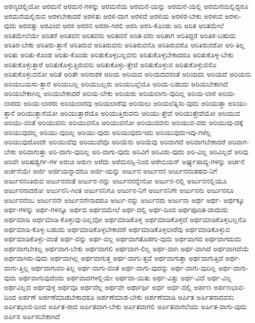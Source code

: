 {ಅರಣ್ಯದಲ್ಲಿಯೋ
ಅರಮನೆ
ಅರಮನೆ-ಗಳನ್ನು
ಅರಮನೆಯ
ಅರಮನೆ-ಯನ್ನು
ಅರಮನೆ-ಯಲ್ಲಿ
ಅರಮನೆಯಲ್ಲಿದ್ದರೂ
ಅರಮನೆಯಲ್ಲಿರುವ
ಅರಳಬೇಕಾದರೆ
ಅರಳಿತು
ಅರಳಿ-ದಾಗ
ಅರಳಿದೆ
ಅರಳಿಯ
ಅರಳಿರ-ಬೇಕು
ಅರಳುವ
ಅರಳು-ವುದು
ಅರವತ್ತು
ಅರವಿಂದ
ಅರಸ
ಅರಸನ
ಅರಸಾ-ಗಿರಲಿ
ಅರಸಿ
ಅರಸಿ-ಕೊಂಡು
ಅರಿ
ಅರಿತ
ಅರಿತಮೇಲೆ
ಅರಿತಮೇಲೆಯೇ
ಅರಿತರೆ
ಅರಿತವನ
ಅರಿತವನು
ಅರಿತವನೆ
ಅರಿತ-ವರು
ಅರಿತಾಗ
ಅರಿತಿದ್ದರೆ
ಅರಿತಿರ-ಬಹುದು
ಅರಿತಿರ-ಬೇಕು
ಅರಿತಿರು-ತ್ತಾನೆ
ಅರಿತಿರುವ
ಅರಿತಿರುವನು
ಅರಿತಿರುವನೊ
ಅರಿತಿರುವರೊ
ಅರಿತಿರುವರೋ
ಅರಿ-ತಿಲ್ಲ
ಅರಿತು
ಅರಿತು-ಕೊಂಡ
ಅರಿತು-ಕೊಂಡು
ಅರಿತುಕೊಳ್ಳಬಲ್ಲವನು
ಅರಿತುಕೊಳ್ಳಬೇಕಾದರೂ
ಅರಿತುಕೊಳ್ಳ-ಬೇಕು
ಅರಿತುಕೊಳ್ಳುತ್ತಾರೆ
ಅರಿತುಕೊಳ್ಳುತ್ತಿರುವನು
ಅರಿತುಕೊಳ್ಳು-ತ್ತೇವೆ
ಅರಿತುಕೊಳ್ಳುವ
ಅರಿತುಕೊಳ್ಳುವನೊ
ಅರಿತುಕೊಳ್ಳುವನೋ
ಅರಿತೆ
ಅರಿತೇ
ಅರಿನಾಶಕ
ಅರಿಯ
ಅರಿಯದ
ಅರಿಯದವನಂತೆ
ಅರಿಯದು
ಅರಿಯದೆ
ಅರಿಯನು
ಅರಿಯಬಯಸು-ತ್ತಾನೆ
ಅರಿಯಬಲ್ಲ
ಅರಿಯಬಲ್ಲರು
ಅರಿಯಬಲ್ಲೆಯೊ
ಅರಿಯ-ಬಹುದು
ಅರಿಯಬೇಕಾಗಿದೆ
ಅರಿಯಬೇಕಾಗಿಲ್ಲ
ಅರಿಯಬೇಕಾದರೆ
ಅರಿಯ-ಬೇಕು
ಅರಿಯರು
ಅರಿಯಲಾಗು-ವುದಿಲ್ಲ
ಅರಿಯ-ಲಾರ
ಅರಿಯ-ಲಾರದು
ಅರಿಯ-ಲಾರರು
ಅರಿಯಲಾರವು
ಅರಿಯಲಾರೆವು
ಅರಿಯಲು
ಅರಿಯಲೆತ್ನಿಸು-ವುದು
ಅರಿಯುತ್ತಾ
ಅರಿಯು-ತ್ತಾನೆ
ಅರಿಯುತ್ತಾನೆಯೋ
ಅರಿಯುತ್ತಾರೆಯೊ
ಅರಿಯುತ್ತಿರುವನು
ಅರಿಯು-ತ್ತೇವೆ
ಅರಿಯುತ್ತೇವೆಯೋ
ಅರಿಯುವ
ಅರಿಯು-ವಂತೆ
ಅರಿಯುವನು
ಅರಿಯುವನೊ
ಅರಿಯುವನೋ
ಅರಿಯುವವನು
ಅರಿಯುವ-ವರು
ಅರಿಯುವು-ದಕ್ಕೆ
ಅರಿಯುವುದಲ್ಲ
ಅರಿಯು-ವುದಿಲ್ಲ
ಅರಿಯು-ವುದು
ಅರಿಯುವುದುಇದು
ಅರಿಯುವುದುಇವು-ಗಳೆಲ್ಲ
ಅರಿಯುವುದೊಂದೇ
ಅರಿಯುವೆವು
ಅರಿಯುವೆವೊ
ಅರಿಯೆನು
ಅರಿಯೆವು
ಅರಿವಾಗದೆ
ಅರಿವಾಗಬೇಕಾದರೆ
ಅರಿವಾಗ-ಬೇಕು
ಅರಿವಾಗುತ್ತಾ
ಅರಿ-ವಾಗು-ವುದಿಲ್ಲ
ಅರಿ-ವಾಗು-ವುದು
ಅರಿವಿಗೆ
ಅರಿವಿರು-ವುದು
ಅರಿ-ವಿಲ್ಲ
ಅರಿವಿಲ್ಲದೆ
ಅರಿವು
ಅರಿವೇ
ಅರಿಷಡ್ವರ್ಗ-ಗಳ
ಅರುಚಿ
ಅರುಣ
ಅರೆದು
ಅರೆಮನಸ್ಸಿ-ನಿಂದ
ಅರೇಬಿಯನ್
ಅರ್ಘ್ಯಪಾದ್ಯ-ಗಳನ್ನು
ಅರ್ಚನೆ
ಅರ್ಚನೆಯೇ
ಅರ್ಜಿ
ಅರ್ಜಿಯನ್ನಾದರೂ
ಅರ್ಜಿ-ಯನ್ನು
ಅರ್ಜುನ
ಅರ್ಜುನನ
ಅರ್ಜುನನಂತಹವ-ನಿಗೆ
ಅರ್ಜುನನಂತಿರುವ
ಅರ್ಜುನನಂತೆ
ಅರ್ಜುನ-ನನ್ನು
ಅರ್ಜುನನನ್ನೇನೋ
ಅರ್ಜುನ-ನಲ್ಲಿ
ಅರ್ಜುನನಲ್ಲಿಯೂ
ಅರ್ಜುನನಾದರೋ
ಅರ್ಜುನನಿ-ಗಿಂತ
ಅರ್ಜುನನಿಗೂ
ಅರ್ಜುನ-ನಿಗೆ
ಅರ್ಜುನನಿಗೇ
ಅರ್ಜುನನು
ಅರ್ಜುನನೂ
ಅರ್ಜುನನೆಂಬ
ಅರ್ಜುನನೇ
ಅರ್ಜುನನೇನಾದರೂ
ಅರ್ಜು-ನನ್ನು
ಅರ್ಜುನರು
ಅರ್ಜುನಾ
ಅರ್ಥ
ಅರ್ಥ-
ಅರ್ಥಕ್ಕೂ
ಅರ್ಥ-ಗಳನ್ನು
ಅರ್ಥ-ಗಳನ್ನೂ
ಅರ್ಥದ
ಅರ್ಥದಮೇಲೆ
ಅರ್ಥ-ದಲ್ಲಿ
ಅರ್ಥ-ದಿಂದ
ಅರ್ಥಪೂರಿತ-ವಾದುದು
ಅರ್ಥಮಾಡಿ
ಅರ್ಥಮಾಡಿ-ಕೊಳ್ಳುವು-ದಿಲ್ಲವೋ
ಅರ್ಥಮಾಡಿಕೊಳ್ಳ
ಅರ್ಥಮಾಡಿಕೊಳ್ಳದೆ
ಅರ್ಥಮಾಡಿಕೊಳ್ಳಬಲ್ಲನೊ
ಅರ್ಥಮಾಡಿ-ಕೊಳ್ಳ-ಬಹುದು
ಅರ್ಥಮಾಡಿಕೊಳ್ಳಬೇಕಾದರೆ
ಅರ್ಥಮಾಡಿಕೊಳ್ಳಲಾರೆವು
ಅರ್ಥಮಾಡಿಕೊಳ್ಳುವ
ಅರ್ಥಮಾಡಿಕೊಳ್ಳು-ವಂತೆ
ಅರ್ಥ-ವನ್ನು
ಅರ್ಥ-ವಲ್ಲ
ಅರ್ಥವಾಗತೊಡಗು-ವುದು
ಅರ್ಥವಾಗದ
ಅರ್ಥವಾಗದುದು
ಅರ್ಥವಾಗಬೇಕಿಲ್ಲ
ಅರ್ಥವಾಗ-ಬೇಕು
ಅರ್ಥವಾಗಲಿ
ಅರ್ಥವಾಗ-ಲಿಲ್ಲ
ಅರ್ಥ-ವಾಗಿ
ಅರ್ಥ-ವಾಗಿದೆ
ಅರ್ಥವಾಗಿದೆಯೆ
ಅರ್ಥವಾಗಿರು-ವುದು
ಅರ್ಥವಾಗಿಲ್ಲ
ಅರ್ಥವಾಗುತ್ತ
ಅರ್ಥ-ವಾಗು-ತ್ತವೆ
ಅರ್ಥವಾಗುತ್ತಾ
ಅರ್ಥವಾಗುತ್ತಿದೆ
ಅರ್ಥ-ವಾಗು-ತ್ತಿಲ್ಲ
ಅರ್ಥವಾಗುವಂ-ತಿಲ್ಲ
ಅರ್ಥ-ವಾಗು-ವಂತೆ
ಅರ್ಥ-ವಾಗು-ವುದನ್ನು
ಅರ್ಥ-ವಾಗು-ವುದಿಲ್ಲ
ಅರ್ಥ-ವಾಗು-ವುದು
ಅರ್ಥವಾಗುವುದೆಂದು
ಅರ್ಥವಾದಗಳಲ್ಲಿಯೇ
ಅರ್ಥವಾ-ಯಿತು
ಅರ್ಥ-ವಿತ್ತು
ಅರ್ಥ-ವಿದೆ
ಅರ್ಥ-ವಿಲ್ಲ
ಅರ್ಥವಿಲ್ಲದ
ಅರ್ಥವುಳ್ಳ
ಅರ್ಥವೂ
ಅರ್ಥವೆಲ್ಲ
ಅರ್ಥವೇ
ಅರ್ಥಾರ್ಥಿ
ಅರ್ಧ
ಅರ್ಧ-ದಲ್ಲಿ
ಅರ್ಪಣ
ಅರ್ಪಣಭಾವ-ದಿಂದ
ಅರ್ಪಣೆ
ಅರ್ಪಣೆಮಾಡಬೇಕಾದರೂ
ಅರ್ಪಣೆಮಾಡ-ಬೇಕು
ಅರ್ಪಣೆಮಾಡಿ
ಅರ್ಪಿತ
ಅರ್ಪಿತನಾದವನು
ಅರ್ಪಿತಭಾವ-ದಿಂದ
ಅರ್ಪಿತ-ರಾದ
ಅರ್ಪಿತವಾಗ-ಬೇಕು
ಅರ್ಪಿತವಾಗಲಿ
ಅರ್ಪಿತವಾಗಲೆಂದು
ಅರ್ಪಿತ-ವಾಗು-ವುದು
ಅರ್ಪಿಸ
ಅರ್ಪಿಸಬೇಕಾಗಿದೆ
}
